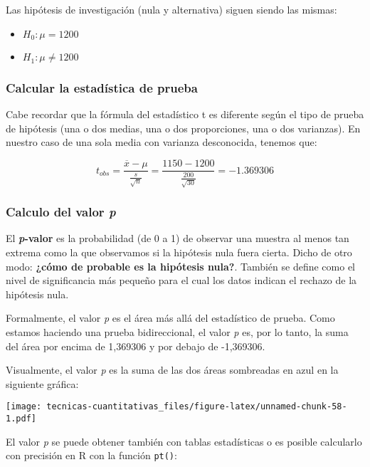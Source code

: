 \documentclass[
]{book}
\providecommand{\tightlist}{%
  \setlength{\itemsep}{0pt}\setlength{\parskip}{0pt}}
\begin{document}
Las hipótesis de investigación (nula y alternativa) siguen siendo las mismas:

\begin{itemize}
\tightlist
\item
  \(H_0:\mu= 1200\)
\item
  \(H_1:\mu\ne 1200\)
\end{itemize}

\hypertarget{calcular-la-estaduxedstica-de-prueba-1}{%
\subsubsection{Calcular la estadística de prueba}\label{calcular-la-estaduxedstica-de-prueba-1}}

Cabe recordar que la fórmula del estadístico t es diferente según el tipo de prueba de hipótesis (una o dos medias, una o dos proporciones, una o dos varianzas). En nuestro caso de una sola media con varianza desconocida, tenemos que:

\[t_{obs} = \frac{\overline{x} - \mu}{\frac{s}{\sqrt{n}}} = \frac{1150 - 1200}{\frac{200}{\sqrt{30}}} = -1.369306\]

\hypertarget{calculo-del-valor-p}{%
\subsubsection{\texorpdfstring{Calculo del valor \emph{p}}{Calculo del valor p}}\label{calculo-del-valor-p}}

El \textbf{\emph{p}-valor} es la probabilidad (de 0 a 1) de observar una muestra al menos tan extrema como la que observamos si la hipótesis nula fuera cierta. Dicho de otro modo: \textbf{¿cómo de probable es la hipótesis nula?}. También se define como el nivel de significancia más pequeño para el cual los datos indican el rechazo de la hipótesis nula.

Formalmente, el valor \emph{p} es el área más allá del estadístico de prueba. Como estamos haciendo una prueba bidireccional, el valor \emph{p} es, por lo tanto, la suma del área por encima de 1,369306 y por debajo de -1,369306.

Visualmente, el valor \emph{p} es la suma de las dos áreas sombreadas en azul en la siguiente gráfica:

\texttt{[image: tecnicas-cuantitativas\_files/figure-latex/unnamed-chunk-58-1.pdf]}

El valor \emph{p} se puede obtener también con tablas estadísticas o es posible calcularlo con precisión en R con la función \texttt{pt()}:
\end{document}

